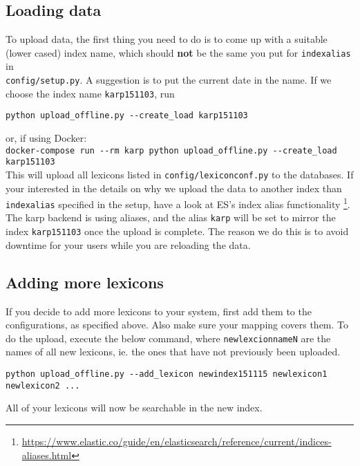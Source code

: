 \documentclass[
12pt, %
a4paper, %
oneside, %
headinclude,footinclude, %
BCOR0mm, %
]{scrartcl}
\begin{document}
\subsection{Loading data}
%
To upload data, the first thing you need to do is to come up with a suitable
(lower cased) index name, which should {\bf not} be the same you put for
\verb|indexalias| in \\
\verb|config/setup.py|.  A suggestion is to put the
current date in the name. If we choose the index name \verb|karp151103|, run
\begin{verbatim}
python upload_offline.py --create_load karp151103
\end{verbatim}
or, if using Docker:\\
\verb|docker-compose run --rm karp python upload_offline.py --create_load karp151103|\\

This will upload all lexicons listed in \verb|config/lexiconconf.py| to the databases.
If your interested in the details on why we upload the data to another index
than \verb|indexalias| specified in the setup, have a look at ES's index alias functionality%
\footnote{\url{https://www.elastic.co/guide/en/elasticsearch/reference/current/indices-aliases.html}}.
The karp backend is using aliases, and the alias \verb|karp| will be set to mirror the index
\verb|karp151103| once the upload is complete.  The reason we do this is to avoid
downtime for your users while you are reloading the data.

\subsection{Adding more lexicons}
\enlargethispage{\baselineskip} %
If you decide to add more lexicons to your system, first add them to the configurations, as specified
above. Also make sure your mapping covers them. To do the upload, execute the below command, where
\verb|newlexcionnameN|
are the names of all new lexicons, ie. the ones that have not previously been uploaded.
\begin{verbatim}
python upload_offline.py --add_lexicon newindex151115 newlexicon1 newlexicon2 ...
\end{verbatim}
%
All of your lexicons will now be searchable in the new index.
\end{document}
